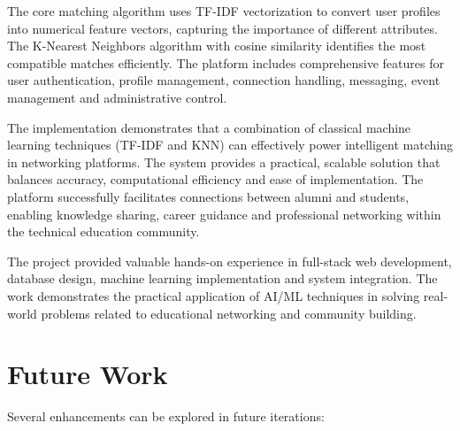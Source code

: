 \documentclass[12pt,a4paper]{report}
\let\origsection\section
\renewcommand{\section}{\needspace{4\baselineskip}\origsection}
\begin{document}
\medskip

\noindent
The core matching algorithm uses TF-IDF vectorization to convert user profiles into numerical feature vectors, capturing the importance of different attributes. The K-Nearest Neighbors algorithm with cosine similarity identifies the most compatible matches efficiently. The platform includes comprehensive features for user authentication, profile management, connection handling, messaging, event management and administrative control.

\medskip

\noindent
The implementation demonstrates that a combination of classical machine learning techniques (TF-IDF and KNN) can effectively power intelligent matching in networking platforms. The system provides a practical, scalable solution that balances accuracy, computational efficiency and ease of implementation. The platform successfully facilitates connections between alumni and students, enabling knowledge sharing, career guidance and professional networking within the technical education community.

\medskip

\noindent
The project provided valuable hands-on experience in full-stack web development, database design, machine learning implementation and system integration. The work demonstrates the practical application of AI/ML techniques in solving real-world problems related to educational networking and community building.

\section{Future Work}

Several enhancements can be explored in future iterations:
\end{document}
